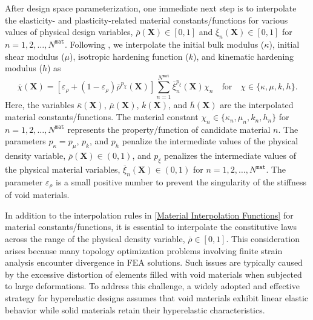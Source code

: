 \documentclass[preprint,11pt]{elsarticle}
\theoremstyle{definition}
\begin{document}
After design space parameterization, one immediate next step is to interpolate the elasticity- and plasticity-related material constants/functions for various values of physical design variables, $\overline{\rho}(\mathbf{X}) \in [0, 1]$ and $\overline{\xi}_n(\mathbf{X}) \in [0, 1]$ for $n=1,2,\ldots,N^\texttt{mat}$. Following \citet{jia_multimaterial_2025}, we interpolate the initial bulk modulus ($\kappa$), initial shear modulus ($\mu$), isotropic hardening function ($k$), and kinematic hardening modulus ($h$) as
\begin{equation} \label{Material Interpolation Functions}
    \overline{\chi}(\mathbf{X}) = \left[\varepsilon_\rho + (1-\varepsilon_\rho) \overline{\rho}^{p_\chi}(\mathbf{X}) \right] 
    \sum_{n=1}^{N^\texttt{mat}} \overline{\xi}_n^{p_\xi}(\mathbf{X}) \chi_n
    \quad \text{for} \quad
    \chi \in \{ \kappa, \mu, k, h \}.
\end{equation}
Here, the variables $\overline{\kappa}(\mathbf{X})$, $\overline{\mu}(\mathbf{X})$, $\overline{k}(\mathbf{X})$, and $\overline{h}(\mathbf{X})$ are the interpolated material constants/functions. The material constant $\chi_n \in \{\kappa_n, \mu_n, k_n, h_n\}$ for $n=1,2,\ldots,N^\texttt{mat}$ represents the property/function of candidate material $n$. The parameters $p_\kappa = p_\mu$, $p_k$, and $p_h$ penalize the intermediate values of the physical density variable, $\overline{\rho}(\mathbf{X}) \in (0, 1)$, and $p_\xi$ penalizes the intermediate values of the physical material variables, $\overline{\xi}_n(\mathbf{X}) \in (0, 1)$ for $n=1,2,\ldots,N^\texttt{mat}$. The parameter $\varepsilon_\rho$ is a small positive number to prevent the singularity of the stiffness of void materials.

In addition to the interpolation rules in \eqref{Material Interpolation Functions} for material constants/functions, it is essential to interpolate the constitutive laws across the range of the physical density variable, $\overline{\rho} \in [0, 1]$. This consideration arises because many topology optimization problems involving finite strain analysis \citep{li_programming_2023} encounter divergence in FEA solutions. Such issues are typically caused by the excessive distortion of elements filled with void materials when subjected to large deformations. To address this challenge, a widely adopted and effective strategy for hyperelastic designs \citep{wang_interpolation_2014} assumes that void materials exhibit linear elastic behavior while solid materials retain their hyperelastic characteristics.
\end{document}
